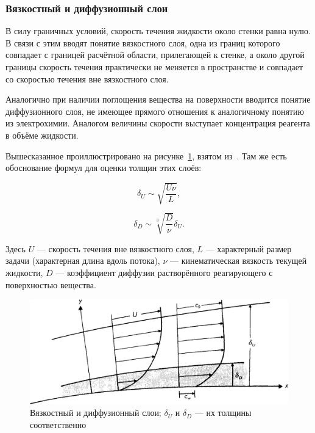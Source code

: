 \documentclass[oneside,final,12pt]{extreport}
\begin{document}
\subsubsection*{Вязкостный и диффузионный слои}
В силу граничных условий, скорость течения жидкости около стенки равна нулю.
В связи с этим вводят понятие вязкостного слоя, одна из границ которого
совпадает с границей расчётной области, прилегающей к стенке,
а около другой границы скорость течения практически не меняется в пространстве
и совпадает со скоростью течения вне вязкостного слоя.

Аналогично при наличии поглощения вещества на поверхности вводится понятие
диффузионного слоя, не имеющее прямого отношения к аналогичному понятию из
электрохимии.
Аналогом величины скорости выступает концентрация реагента в объёме жидкости.

Вышесказанное проиллюстрировано на рисунке~\ref{fig:visc_diff_layers},
взятом из~\cite{bib:phys_chem_hydro_layers}.
Там же есть обоснование формул для оценки толщин этих слоёв:

\begin{equation}
  \delta_U \sim \sqrt{\frac{U\nu}{L}},
\label{eq:viscous_layer}
\end{equation}

\begin{equation}
  \delta_D \sim \sqrt[3]{\frac{D}{\nu}} \delta_U.
\label{eq:diffusion_layer}
\end{equation}

Здесь $U$ --- скорость течения вне вязкостного слоя,
$L$ --- характерный размер задачи (характерная длина вдоль потока),
$\nu$ --- кинематическая вязкость текущей жидкости,
$D$ --- коэффициент диффузии растворённого реагирующего с поверхностью вещества.


\begin{figure}
  \centering
  \includegraphics[width=.7\textwidth]{pic/visc_diff_layers}
  \caption{\label{fig:visc_diff_layers}%
    Вязкостный и диффузионный слои;
    $\delta_U$ и $\delta_D$ --- их толщины соответственно
  }

\end{figure}
\end{document}
